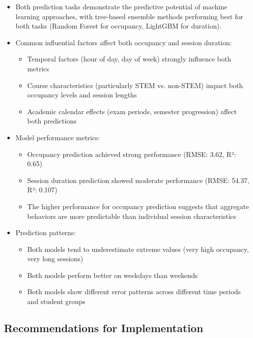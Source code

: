 \documentclass[12pt,letterpaper]{article}
\begin{document}
\begin{itemize}
    \item Both prediction tasks demonstrate the predictive potential of machine learning approaches, with tree-based ensemble methods performing best for both tasks (Random Forest for occupancy, LightGBM for duration).
    
    \item Common influential factors affect both occupancy and session duration:
    \begin{itemize}
        \item Temporal factors (hour of day, day of week) strongly influence both metrics
        \item Course characteristics (particularly STEM vs. non-STEM) impact both occupancy levels and session lengths
        \item Academic calendar effects (exam periods, semester progression) affect both predictions
    \end{itemize}
    
    \item Model performance metrics:
    \begin{itemize}
        \item Occupancy prediction achieved strong performance (RMSE: 3.62, R²: 0.65)
        \item Session duration prediction showed moderate performance (RMSE: 54.37, R²: 0.107)
        \item The higher performance for occupancy prediction suggests that aggregate behaviors are more predictable than individual session characteristics
    \end{itemize}
    
    \item Prediction patterns:
    \begin{itemize}
        \item Both models tend to underestimate extreme values (very high occupancy, very long sessions)
        \item Both models perform better on weekdays than weekends
        \item Both models show different error patterns across different time periods and student groups
    \end{itemize}
\end{itemize}

\subsection{Recommendations for Implementation}
\end{document}
